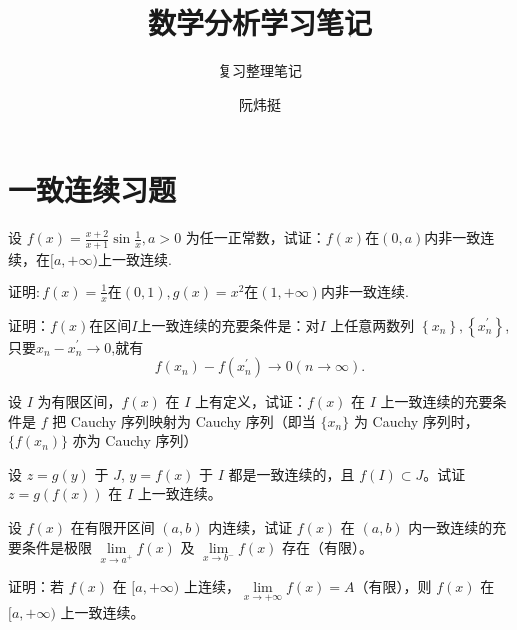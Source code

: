 \documentclass[lang=cn,newtx,10pt,scheme=chinese]{elegantbook}
\title{数学分析学习笔记}
\subtitle{复习整理笔记}
\author{阮炜挺}
\institute{宁波大学数学与统计学院}
\date{}
\begin{document}
\maketitle
\frontmatter

\tableofcontents

\mainmatter

\chapter{一致连续习题}
\begin{example}
    设 $f(x)=\frac{x+2}{x+1}\sin\frac1x,a>0$ 为任一正常数，试证：$f(x)$在$(0,a)$内非一致连续，在$[a,+\infty)$上一致连续.
\end{example}

\begin{example}
    $\text{证明}:f(x)=\frac{1}{x}\text{在}(0,1),g(x)=x^2\text{在}(1,+\infty)\text{内非一致连续}.$
\end{example}

\begin{example}
    证明：$f(x)$在区间$I$上一致连续的充要条件是：对$I$ 上任意两数列
$\left\{x_n\right\},\left\{x_n^{\prime}\right\}$,只要$x_n-x_n^{\prime}\to0$,就有$$f(x_n)-f(x_n^{\prime})\to0(n\to\infty).$$
\end{example}

\begin{example}
    设 $I$ 为有限区间，$f(x)$ 在 $I$ 上有定义，试证：$f(x)$ 在 $I$ 上一致连续的充要条件是 $f$ 把 Cauchy 序列映射为 Cauchy 序列（即当 $\{x_n\}$ 为 Cauchy 序列时，$\{f(x_n)\}$ 亦为 Cauchy 序列）
\end{example}

\begin{example}
    设 $z = g(y)$ 于 $J$, $y = f(x)$ 于 $I$ 都是一致连续的，且 $f(I) \subset J$。试证 $z = g(f(x))$ 在 $I$ 上一致连续。
\end{example}

\begin{example}
    设 $f(x)$ 在有限开区间 $(a, b)$ 内连续，试证 $f(x)$ 在 $(a, b)$ 内一致连续的充要条件是极限 $\lim\limits_{x \to a^+} f(x)$ 及 $\lim\limits_{x \to b^-} f(x)$ 存在（有限）。
\end{example}

\begin{example}
    证明：若 $f(x)$ 在 $[a, +\infty)$ 上连续，$\lim\limits_{x \to +\infty} f(x) = A$（有限），则 $f(x)$ 在 $[a, +\infty)$ 上一致连续。
\end{example}
\end{document}
